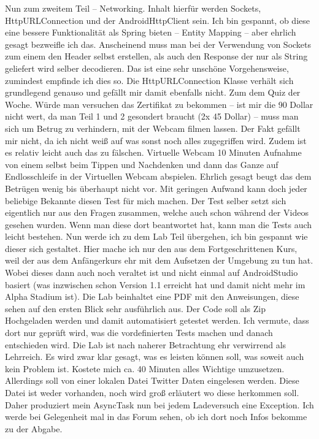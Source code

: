 \documentclass[12pt,a4paper,bibliography=totocnumbered,listof=totocnumbered]{scrartcl}
\begin{document}
Nun zum zweitem Teil – Networking. 
Inhalt hierfür werden Sockets, HttpURLConnection und der AndroidHttpClient sein. Ich bin gespannt, ob diese eine bessere Funktionalität als Spring bieten – Entity Mapping – aber ehrlich gesagt bezweifle ich das.  Anscheinend muss man bei der Verwendung von Sockets zum einem den Header selbst erstellen, als auch den Response der nur als String geliefert wird selber decodieren. Das ist eine sehr unschöne Vorgehensweise, zumindest empfinde ich dies so. Die HttpURLConnection Klasse verhält sich grundlegend genauso und gefällt mir damit ebenfalls nicht. 
Zum dem Quiz der Woche. 
Würde man versuchen das Zertifikat zu bekommen – ist mir die 90 Dollar nicht wert, da man Teil 1 und 2 gesondert braucht (2x 45 Dollar) – muss man sich um Betrug zu verhindern, mit der Webcam filmen lassen. Der Fakt gefällt mir nicht, da ich nicht weiß auf was sonst noch alles zugegriffen wird. Zudem ist es relativ leicht auch das zu fälschen. Virtuelle Webcam 10 Minuten Aufnahme von einem selbst beim Tippen und Nachdenken und dann das Ganze auf Endlosschleife in der Virtuellen Webcam abspielen. Ehrlich gesagt beugt das dem Betrügen  wenig bis überhaupt nicht vor.  Mit geringen Aufwand kann doch jeder beliebige Bekannte diesen Test für mich machen. 
Der Test selber setzt sich eigentlich nur aus den Fragen zusammen, welche auch schon während der Videos gesehen wurden. Wenn man diese dort beantwortet hat, kann man die Tests auch leicht bestehen. 
Nun werde ich zu dem Lab Teil übergehen, ich bin gespannt wie dieser sich gestaltet. Hier mache ich nur den aus dem Fortgeschrittenen Kurs, weil der aus dem Anfängerkurs ehr mit dem Aufsetzen der Umgebung zu tun hat. Wobei dieses dann auch noch veraltet ist und nicht einmal auf AndroidStudio basiert (was inzwischen schon Version 1.1 erreicht hat und damit nicht mehr im Alpha Stadium ist).
Die Lab beinhaltet eine PDF mit den Anweisungen, diese sehen auf den ersten Blick sehr ausführlich aus. Der Code soll als Zip Hochgeladen werden und damit automatisiert getestet werden. Ich vermute, dass dort nur geprüft wird, was die vordefinierten Tests machen und danach entschieden wird. 
Die Lab ist nach naherer Betrachtung ehr verwirrend als Lehrreich. Es wird zwar klar gesagt, was es leisten können soll, was soweit auch kein Problem ist. Kostete mich ca. 40 Minuten alles Wichtige umzusetzen. Allerdings soll von einer lokalen Datei Twitter Daten eingelesen werden. Diese Datei ist weder vorhanden, noch wird groß erläutert wo diese herkommen soll. Daher produziert mein AsyncTask nun bei jedem Ladeversuch eine Exception. Ich werde bei Gelegenheit mal in das Forum sehen, ob ich dort noch Infos bekomme zu der Abgabe. 
\end{document}

